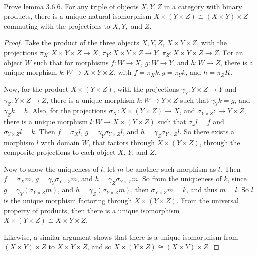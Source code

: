 \documentclass[../../main]{subfiles}
\begin{document}
\paragraph{}
\begin{exercise}
Prove lemma 3.6.6. For any triple of objects $X, Y, Z$ in a category with binary products, there is a unique natural isomorphism $X \times (Y \times Z) \cong (X \times Y) \times Z$ commuting with the projections to $X, Y,$ and $Z$.
\end{exercise}

	
\begin{proof}
Take the product of the three objects $X, Y, Z$, $X \times Y \times Z$, with the projections $\pi_X : X \times Y \times Z \rightarrow X$, $\pi_Y : X \times Y \times Z \rightarrow Y$, $\pi_Z : X \times Y \times Z \rightarrow Z$. For an object $W$ such that for morphisms $f: W \rightarrow X$, $g: W \rightarrow Y$, and $h: W \rightarrow Z$, there is a unique morphism $k: W \rightarrow X \times Y \times Z$, with $f = \pi_Xk, g = \pi_Yk$, and $h = \pi_ZK$.

Now, for the product $X \times (Y \times Z)$, with the projections $\gamma_Y : Y \times Z \rightarrow Y$ and $\gamma_Z : Y \times Z \rightarrow Z$, there is a unique morphism $k: W \rightarrow Y \times Z$ such that $\gamma_Y k = g$, and $\gamma_Z k = h$. Also, for the projections $\sigma_X : X \times (Y \times Z) \rightarrow X$, and $\sigma_{Y \times Z} : \rightarrow Y \times Z$, there is a unique morphism $l: W \rightarrow X \times (Y \times Z)$ such that $\sigma_x l = f$ and $\sigma_{Y \times Z}l = k$. Then $f = \sigma_Xl$, $g = \gamma_Y \sigma_{Y \times Z} l$, and $h = \gamma_Z \sigma_{Y \times Z} l$. So there exists a morphism $l$ with domain $W$, that factors through $X \times (Y \times Z)$, through the composite projections to each object $X$, $Y$, and $Z$.

Now to show the uniqueness of $l$, let $m$ be another such morphism as $l$. Then $f = \sigma_X m$, $g = \gamma_Y \sigma_{Y \times Z} m$, and $h = \gamma_Z \sigma_{Y \times Z} m$. So from the uniqueness of $k$, since $g = \gamma_Y (\sigma_{Y \times Z} m)$, and $h = \gamma_Z (\sigma_{Y \times Z} m)$, then $\sigma_{Y \times Z} m = k$, and thus $m = l$. So $l$ is the unique morphism factoring through $X \times (Y \times Z)$. From the universal property of products, then there is a unique isomorphism $X \times (Y \times Z) \cong X \times Y \times Z$.

Likewise, a similar argument shows that there is a unique isomorphism from $(X \times Y) \times Z$ to $X \times Y \times Z$, and so $X \times (Y \times Z) \cong (X \times Y) \times Z$.

\end{proof}	
	
	
\end{document}

